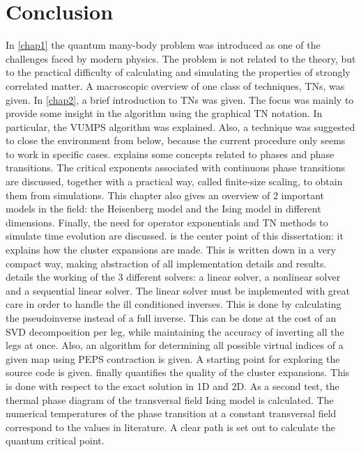 \section{Conclusion}

In \cref{chap1} the quantum many-body problem was introduced as one of the challenges faced by modern physics. The problem is not related to the theory, but to the practical difficulty of calculating and simulating the properties of strongly correlated matter. A macroscopic overview of one class of techniques, \Glspl{TN}, was given.
In \cref{chap2}, a brief introduction to \Glspl{TN} was given. The focus was mainly to provide some insight in the algorithm using the graphical \Gls{TN} notation. In particular, the \Gls{VUMPS} algorithm was explained. Also, a technique was suggested to close the environment from below, because the current procedure only seems to work in specific cases.
 explains some concepts related to phases and phase transitions. The critical exponents associated with continuous phase transitions are discussed, together with a practical way, called finite-size scaling, to obtain them from simulations. This chapter also gives an overview of 2 important models in the field: the Heisenberg model and the Ising model in different dimensions. Finally, the need for operator exponentials and \Gls{TN} methods to simulate time evolution are discussed.
 is the center point of this dissertation: it explains how the cluster expansions are made. This is written down in a very compact way, making abstraction of all implementation details and results.
 details the working of the 3 different solvers: a linear solver, a nonlinear solver and a sequential linear solver. The linear solver must be implemented with great care in order to handle the ill conditioned inverses. This is done by calculating the pseudoinverse instead of a full inverse. This can be done at the cost of an \Gls{SVD} decomposition per leg, while maintaining the accuracy of inverting all the legs at once. Also, an algorithm for determining all possible virtual indices of a given map using \Gls{PEPS} contraction is given.  A starting point for exploring the source code is given.
 finally quantifies the quality of the cluster expansions. This is done with respect to the exact solution in 1D and 2D. As a second test, the thermal phase diagram of the transversal field Ising model is calculated. The numerical temperatures of the phase transition at a constant transversal field correspond to the values in literature. A clear path is set out to calculate the quantum critical point.

